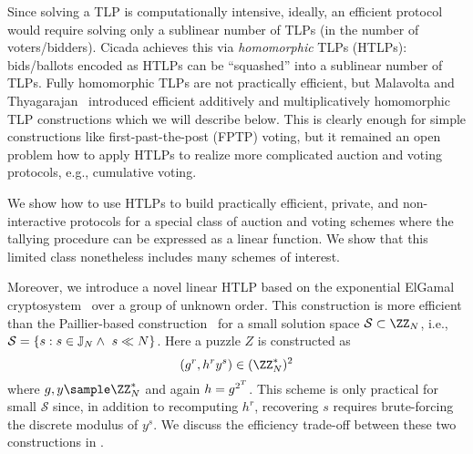 Since solving a TLP is computationally intensive, ideally, an efficient protocol would require solving only a sublinear number of TLPs (in the number of voters/bidders). Cicada achieves this via \emph{homomorphic} TLPs (HTLPs): bids/ballots encoded as HTLPs can be ``squashed'' into a sublinear number of TLPs. Fully homomorphic TLPs are not practically efficient, but Malavolta and Thyagarajan~\cite{C:MalThy19} introduced efficient additively and multiplicatively homomorphic TLP constructions which we will describe below. This is clearly enough for simple constructions like first-past-the-post (FPTP) voting, but it remained an open problem how to apply HTLPs to realize more complicated auction and voting protocols, e.g., cumulative voting.

We show how to use HTLPs to build practically efficient, private, and non-interactive protocols for a special class of auction and voting schemes where the tallying procedure can be expressed as a linear function. We show that this limited class nonetheless includes many schemes of interest.

Moreover, we introduce a novel linear HTLP based on the exponential ElGamal cryptosystem~\cite{EC:CraGenSch97} over a group of unknown order. This construction is more efficient than the Paillier-based construction~\cite{C:MalThy19} for a small solution space $\mathcal{S} \subset \ZZ_N$, i.e., $\mathcal{S} = \{ s : s \in \mathbb{J}_N \land\ s \ll N \}$. Here a puzzle $Z$ is constructed as
\begin{equation}\label{eq:exp_elgamalHTLP}
(g^r, h^r y^s) \in (\ZZ_N^*)^2
\end{equation}
where $g,y \sample \ZZ_N^*$ and again $h = g^{2^{T}}$. This scheme is only practical for small $\mathcal{S}$ since, in addition to recomputing $h^r$, recovering $s$ requires brute-forcing the discrete modulus of $y^s$. We discuss the efficiency trade-off between these two constructions in .

